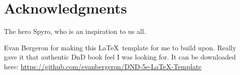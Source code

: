 \section{Acknowledgments} %

The hero Spyro, who is an inspiration to us all.

Evan Bergeron for making this \LaTeX\ template for me to build upon. Really gave it that authentic DnD book feel I was looking for. It can be downloaded here: \url{https://github.com/evanbergeron/DND-5e-LaTeX-Template}

